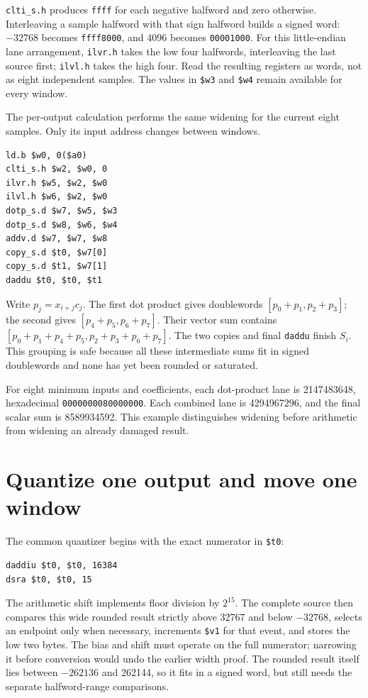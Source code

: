 \texttt{clti\_s.h} produces \texttt{ffff} for each negative halfword and zero
otherwise. Interleaving a sample halfword with that sign halfword builds a signed
word: $-32768$ becomes \texttt{ffff8000}, and 4096 becomes \texttt{00001000}.
For this little-endian lane arrangement, \texttt{ilvr.h} takes the low four
halfwords, interleaving the last source first; \texttt{ilvl.h} takes the high
four. Read the resulting registers as words, not as eight independent samples.
The values in \texttt{\$w3} and \texttt{\$w4} remain available for every window.

The per-output calculation performs the same widening for the current eight
samples. Only its input address changes between windows.
\begin{verbatim}
ld.b $w0, 0($a0)
clti_s.h $w2, $w0, 0
ilvr.h $w5, $w2, $w0
ilvl.h $w6, $w2, $w0
dotp_s.d $w7, $w5, $w3
dotp_s.d $w8, $w6, $w4
addv.d $w7, $w7, $w8
copy_s.d $t0, $w7[0]
copy_s.d $t1, $w7[1]
daddu $t0, $t0, $t1
\end{verbatim}

Write $p_j=x_{i+j}c_j$. The first dot product gives doublewords
$[p_0+p_1,p_2+p_3]$; the second gives $[p_4+p_5,p_6+p_7]$. Their vector sum
contains $[p_0+p_1+p_4+p_5,p_2+p_3+p_6+p_7]$. The two copies and final
\texttt{daddu} finish $S_i$. This grouping is safe because all these intermediate
sums fit in signed doublewords and none has yet been rounded or saturated.

For eight minimum inputs and coefficients, each dot-product lane is 2147483648,
hexadecimal \texttt{0000000080000000}. Each combined lane is 4294967296, and
the final scalar sum is 8589934592. This example distinguishes widening before
arithmetic from widening an already damaged result.

\section{Quantize one output and move one window}

The common quantizer begins with the exact numerator in \texttt{\$t0}:
\begin{verbatim}
daddiu $t0, $t0, 16384
dsra $t0, $t0, 15
\end{verbatim}
The arithmetic shift implements floor division by $2^{15}$. The complete source
then compares this wide rounded result strictly above 32767 and below $-32768$,
selects an endpoint only when necessary, increments \texttt{\$v1} for that event,
and stores the low two bytes. The bias and shift must operate on the full
numerator; narrowing it before conversion would undo the earlier width proof.
The rounded result itself lies between $-262136$ and 262144, so it fits in a
signed word, but still needs the separate halfword-range comparisons.

